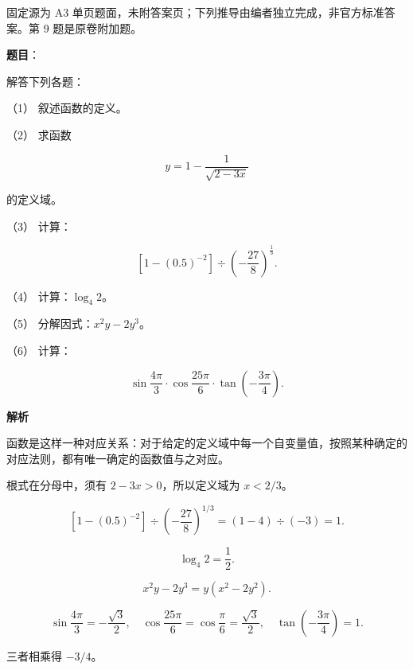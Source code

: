 

\begin{gktip}
固定源为 A3 单页题面，未附答案页；下列推导由编者独立完成，非官方标准答案。第 9 题是原卷附加题。
\end{gktip}

\begin{answer}

\textbf{题目}：

解答下列各题：

（1） 叙述函数的定义。

（2） 求函数

\nopagebreak[4]
\[
y=1-\frac1{\sqrt{2-3x}}
\]

的定义域。

（3） 计算：

\nopagebreak[4]
\[
\left[1-(0.5)^{-2}\right]\div\left(-\frac{27}{8}\right)^{\frac13}.
\]

（4） 计算：$\log_4 2$。

（5） 分解因式：$x^2y-2y^3$。

（6） 计算：

\nopagebreak[4]
\[
\sin\frac{4\pi}{3}\cdot\cos\frac{25\pi}{6}\cdot\tan\left(-\frac{3\pi}{4}\right).
\]

\textbf{解析}


函数是这样一种对应关系：对于给定的定义域中每一个自变量值，按照某种确定的对应法则，都有唯一确定的函数值与之对应。


根式在分母中，须有 $2-3x>0$，所以定义域为 $x<2/3$。


\nopagebreak[4]
\[
\left[1-(0.5)^{-2}\right]\div\left(-\frac{27}{8}\right)^{1/3}
=\left(1-4\right)\div(-3)=1.
\]


\nopagebreak[4]
\[
\log_4 2=\frac12.
\]


\nopagebreak[4]
\[
x^2y-2y^3=y(x^2-2y^2).
\]


\nopagebreak[4]
\[
\sin\frac{4\pi}{3}=-\frac{\sqrt3}{2},
\quad
\cos\frac{25\pi}{6}=\cos\frac\pi6=\frac{\sqrt3}{2},
\quad
\tan\left(-\frac{3\pi}{4}\right)=1.
\]

三者相乘得 $-3/4$。







\end{answer}
